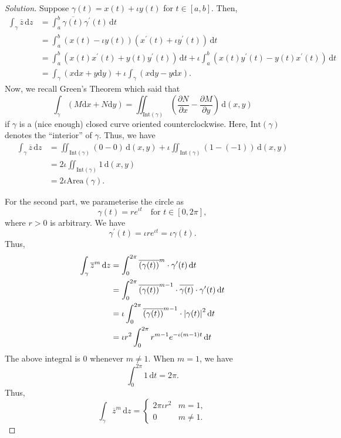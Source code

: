 \documentclass[11pt]{article}
\theoremstyle{definition}
\newenvironment{soln}{\begin{proof}[Solution]}{\end{proof}}
\begin{document}
\begin{enumerate}[leftmargin=*]
\begin{soln}
Suppose $\gamma(t) = x(t) + \iota y(t)$ for $t \in [a,b]$. Then,
\begin{align*}
    \int_{\gamma} \overline{z} \, \mathrm{d}z &= \int_a^b \overline{\gamma(t)} \gamma^{\prime}(t) \, \mathrm{d}t \\
    &= \int_a^b (x(t) - \iota y(t)) (x^{\prime}(t) + \iota y^{\prime}(t)) \, \mathrm{d}t \\
    &= \int_a^b (x(t)x^{\prime}(t) + y(t)y^{\prime}(t)) \, \mathrm{d}t + \iota \int_a^b (x(t) y^{\prime}(t) - y(t) x^{\prime}(t)) \, \mathrm{d}t \\
    &= \int_{\gamma} (x \mathrm{d}x + y\mathrm{d}y) + \iota \int_{\gamma} (x \mathrm{d}y - y\mathrm{d}x).
\end{align*}
Now, we recall Green's Theorem which said that
\[
    \int_{\gamma} (M \mathrm{d}x + N \mathrm{d}y) = \iint_{\text{Int}(\gamma)} \left( \frac{\partial N}{\partial x} - \frac{\partial M}{\partial y} \right) \, \mathrm{d}(x,y)
\]
if $\gamma$ is a (nice enough) closed curve oriented counterclockwise. Here, $\text{Int}(\gamma)$ denotes the ``interior'' of $\gamma$. Thus, we have
\begin{align*}
    \int_{\gamma} \overline{z} \, \mathrm{d}z &= \iint_{\text{Int}(\gamma)} (0 - 0) \, \mathrm{d}(x,y) + \iota \iint_{\text{Int}(\gamma)} (1 - (-1)) \, \mathrm{d}(x,y) \\
    &= 2\iota \iint_{\text{Int}(\gamma)} 1 \, \mathrm{d}(x,y) \\
    &= 2\iota \text{Area}(\gamma).
\end{align*}

For the second part, we parameterise the circle as
\[
    \gamma(t) = re^{\iota t} \quad \text{for } t \in [0,2\pi],
\]
where $r > 0$ is arbitrary. We have 
\[
    \gamma^{\prime}(t) = \iota r e^{\iota t} = \iota \gamma(t).
\]
Thus, 
\begin{align*}
    \int_{\gamma} \overline{z}^m \, \mathrm{d}z &= \int_0^{2\pi} \overline{\left( \gamma(t) \right)}^m \cdot \gamma^{\prime}(t) \, \mathrm{d}t \\
    &= \int_0^{2\pi} \overline{\left( \gamma(t) \right)}^{m-1} \cdot \overline{\gamma(t)} \cdot \gamma^{\prime}(t) \, \mathrm{d}t \\
    &= \iota \int_0^{2\pi} \overline{\left( \gamma(t) \right)}^{m-1} \cdot \abs{\gamma(t)}^2 \, \mathrm{d}t \\
    &= \iota r^2 \int_0^{2\pi} r^{m-1} e^{-\iota (m-1)t} \, \mathrm{d}t
\end{align*}
The above integral is $0$ whenever $m \neq 1$. When $m=1$, we have
\[
    \int_0^{2\pi} 1 \, \mathrm{d}t = 2\pi.
\]
Thus, 
\[
    \int_{\gamma} \overline{z}^m \, \mathrm{d}z = \begin{cases}
        2\pi\iota r^2 & m = 1, \\
        0 & m \neq 1.
    \end{cases}
\]
\end{soln}


\end{enumerate}
\end{document}
